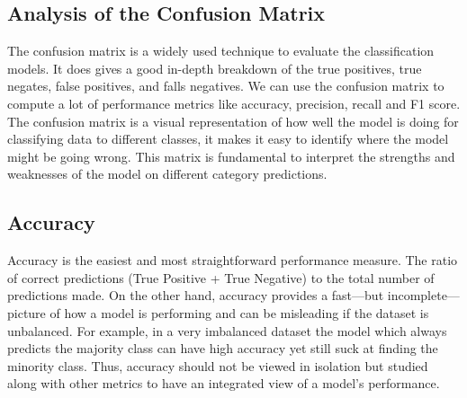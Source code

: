 \subsection{Analysis of the Confusion Matrix} 
The confusion matrix is a widely used technique to evaluate the classification models. It does gives a good in-depth breakdown of the true positives, true negates, false positives, and falls negatives. We can use the confusion matrix to compute a lot of performance metrics like accuracy, precision, recall and F1 score. The confusion matrix is a visual representation of how well the model is doing for classifying data to different classes, it makes it easy to identify where the model might be going wrong. This matrix is fundamental to interpret the strengths and weaknesses of the model on different category predictions.

 


\subsection{Accuracy}

Accuracy is the easiest and most straightforward performance measure. The ratio of correct predictions (True Positive + True Negative) to the total number of predictions made. On the other hand, accuracy provides a fast—but incomplete—picture of how a model is performing and can be misleading if the dataset is unbalanced. For example, in a very imbalanced dataset the model which always predicts the majority class can have high accuracy yet still suck at finding the minority class. Thus, accuracy should not be viewed in isolation but studied along with other metrics to have an integrated view of a model's performance.


